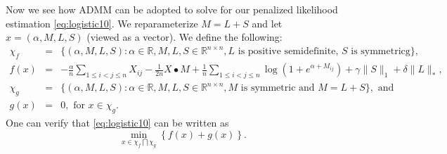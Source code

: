 \documentclass{article}
\begin{document}
Now we see how ADMM can be adopted to solve for our penalized likelihood estimation \eqref{eq:logistic10}.
We reparameterize $M = L + S$ and let $x = (\alpha, M, L, S)$ (viewed as a vector).
We define the following:
\begin{eqnarray*}
\chi_f &=& \{ (\alpha, M, L, S): \alpha\in\mathbb{R}, M, L, S \in \mathbb{R}^{n \times n},
L \mbox{ is positive semidefinite, }
S \mbox{ is symmetricg} \}, \\
f(x) &=&
-\frac{\alpha}{n} \sum_{1\le i< j\le n}X_{ij}
-\frac{1}{2n} X \bullet M %
+ \frac{1}{n}
\sum_{1\le i<j\le n} \log \left(1 + e^{\alpha + M_{ij}}\right)
+ \gamma \|S\|_1
+ \delta \|L\|_\ast, \\
\chi_g &=& \{ (\alpha, M, L, S): \alpha\in\mathbb{R}, M, L, S \in \mathbb{R}^{n \times n},
M \mbox{ is symmetric and } M=L+S \}, \mbox{ and }\\
g(x) &=& 0, \mbox{ for } x \in \chi_g.
\end{eqnarray*}
One can verify that \eqref{eq:logistic10} can be written as
$$
\min_{x \in \chi_f \bigcap \chi_g} \left\{f(x) + g(x) \right\}.
$$
\end{document}
